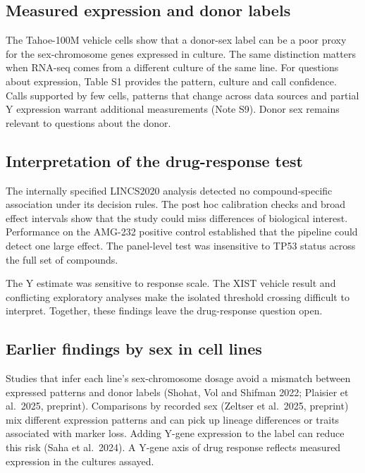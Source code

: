 \documentclass[
  11pt,
  letterpaper,
]{article}
\begin{document}
\subsection{Measured expression and donor
labels}\label{measured-expression-and-donor-labels}

The Tahoe-100M vehicle cells show that a donor-sex label can be a poor
proxy for the sex-chromosome genes expressed in culture. The same
distinction matters when RNA-seq comes from a different culture of the
same line. For questions about expression, Table S1 provides the
pattern, culture and call confidence. Calls supported by few cells,
patterns that change across data sources and partial Y expression
warrant additional measurements (Note S9). Donor sex remains relevant to
questions about the donor.

\subsection{Interpretation of the drug-response
test}\label{interpretation-of-the-drug-response-test}

The internally specified LINCS2020 analysis detected no
compound-specific association under its decision rules. The post hoc
calibration checks and broad effect intervals show that the study could
miss differences of biological interest. Performance on the AMG-232
positive control established that the pipeline could detect one large
effect. The panel-level test was insensitive to TP53 status across the
full set of compounds.

The Y estimate was sensitive to response scale. The XIST vehicle result
and conflicting exploratory analyses make the isolated threshold
crossing difficult to interpret. Together, these findings leave the
drug-response question open.

\subsection{Earlier findings by sex in cell
lines}\label{earlier-findings-by-sex-in-cell-lines}

Studies that infer each line's sex-chromosome dosage avoid a mismatch
between expressed patterns and donor labels (Shohat, Vol and Shifman
2022; Plaisier et al.~2025, preprint). Comparisons by recorded sex
(Zeltser et al.~2025, preprint) mix different expression patterns and
can pick up lineage differences or traits associated with marker loss.
Adding Y-gene expression to the label can reduce this risk (Saha et
al.~2024). A Y-gene axis of drug response reflects measured expression
in the cultures assayed.
\end{document}
